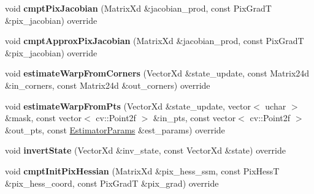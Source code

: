 \begin{DoxyCompactItemize}
\item 
\hypertarget{classLieHomography_ac1359f4b5b7d08970a540fb9f8b9023d}{void {\bfseries cmpt\-Pix\-Jacobian} (Matrix\-Xd \&jacobian\-\_\-prod, const Pix\-Grad\-T \&pix\-\_\-jacobian) override}\label{classLieHomography_ac1359f4b5b7d08970a540fb9f8b9023d}

\item 
\hypertarget{classLieHomography_af3c47617230a514c30ac37e249213f21}{void {\bfseries cmpt\-Approx\-Pix\-Jacobian} (Matrix\-Xd \&jacobian\-\_\-prod, const Pix\-Grad\-T \&pix\-\_\-jacobian) override}\label{classLieHomography_af3c47617230a514c30ac37e249213f21}

\item 
\hypertarget{classLieHomography_a9219fc12d8f9b38c988c5fd72f3996d5}{void {\bfseries estimate\-Warp\-From\-Corners} (Vector\-Xd \&state\-\_\-update, const Matrix24d \&in\-\_\-corners, const Matrix24d \&out\-\_\-corners) override}\label{classLieHomography_a9219fc12d8f9b38c988c5fd72f3996d5}

\item 
\hypertarget{classLieHomography_aa6874d732e2c9269fa0903034edec422}{void {\bfseries estimate\-Warp\-From\-Pts} (Vector\-Xd \&state\-\_\-update, vector$<$ uchar $>$ \&mask, const vector$<$ cv\-::\-Point2f $>$ \&in\-\_\-pts, const vector$<$ cv\-::\-Point2f $>$ \&out\-\_\-pts, const \hyperlink{structSSMEstimatorParams}{Estimator\-Params} \&est\-\_\-params) override}\label{classLieHomography_aa6874d732e2c9269fa0903034edec422}

\item 
\hypertarget{classLieHomography_adf69401801a0fe45066ea16a5bba51ff}{void {\bfseries invert\-State} (Vector\-Xd \&inv\-\_\-state, const Vector\-Xd \&state) override}\label{classLieHomography_adf69401801a0fe45066ea16a5bba51ff}

\item 
\hypertarget{classLieHomography_a3dd0fe245a98c615bf82e771cbcabe5e}{void {\bfseries cmpt\-Init\-Pix\-Hessian} (Matrix\-Xd \&pix\-\_\-hess\-\_\-ssm, const Pix\-Hess\-T \&pix\-\_\-hess\-\_\-coord, const Pix\-Grad\-T \&pix\-\_\-grad) override}\label{classLieHomography_a3dd0fe245a98c615bf82e771cbcabe5e}

\end{DoxyCompactItemize}
